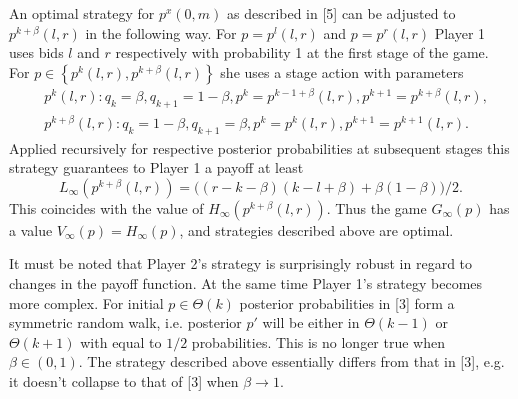 An optimal strategy for $p^x(0, m)$ as described in [5] can be adjusted to
$p^{k+\beta}(l, r)$ in the following way. For $p = p^l(l, r)$ and $p = p^r(l,r)$
Player 1 uses bids $l$ and $r$ respectively with probability 1 at the first
stage of the game. For $p \in \left\{ p^k(l, r), p^{k+\beta}(l,r) \right\}$ she
uses a stage action with parameters
\begin{align*}
  &p^k(l,r):
    q_k = \beta,
    q_{k+1} = 1-\beta,
    p^k = p^{k-1+\beta}(l,r),
    p^{k+1} = p^{k+\beta}(l,r),\\
  &p^{k+\beta}(l,r):
    q_k = 1-\beta,
    q_{k+1} = \beta,
    p^k = p^k(l,r),
    p^{k+1} = p^{k+1}(l,r).
\end{align*}
Applied recursively for respective posterior probabilities at subsequent stages
this strategy guarantees to Player 1 a payoff at least
\begin{equation*}
  L_\infty\left(p^{k+\beta}(l, r)\right)
  = \bigl( (r - k - \beta)(k - l + \beta) + \beta(1-\beta) \bigr)/2.
\end{equation*}
This coincides with the value of $H_\infty\left(p^{k+\beta}(l, r)\right)$. Thus
the game $G_\infty(p)$ has a value $V_\infty(p) = H_\infty(p)$, and strategies
described above are optimal.

It must be noted that Player 2's strategy is surprisingly robust in regard to
changes in the payoff function. At the same time Player 1's strategy becomes
more complex. For initial $p \in \Theta(k)$ posterior prob\-a\-bil\-i\-ties in
[3] form a symmetric random walk, i.e. posterior $p'$ will be either in
$\Theta(k-1)$ or $\Theta(k+1)$ with equal to $1/2$ probabilities. This is no
longer true when $\beta \in (0, 1)$. The strategy described above essentially
differs from that in [3], e.g. it doesn't collapse to that of [3] when $\beta
\rightarrow 1$.



